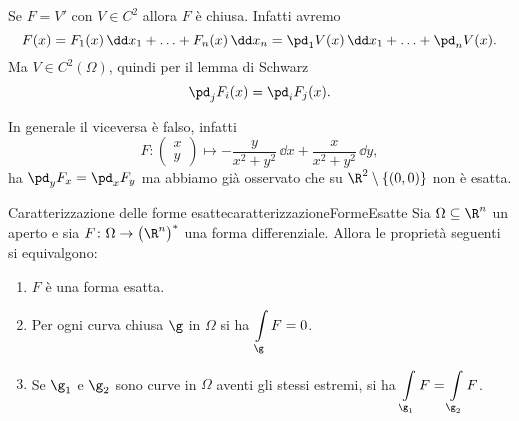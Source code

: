 \begin{oss}
	Se \(F=V'\) con \(V\in C^2\) allora \(F\) è chiusa.
	Infatti avremo
	\[
		F(x) = F_1(x)\,\dd x_1+ \ldots + F_n(x)\,\dd x_n = \pd_1 V(x)\,\dd x_1 + \ldots + \pd_n V(x).
	\]
	Ma \(V\in C^2(\Omega)\), quindi per il lemma di Schwarz
	\[
		\pd_j F_i(x) = \pd_i F_j(x).
	\]
\end{oss}

\begin{oss}
	In generale il viceversa è falso, infatti
	\[
		F\colon \begin{pmatrix}x\\y\end{pmatrix} \mapsto -\frac{y}{x^2+y^2}\,\dd x + \frac{x}{x^2+y^2}\,\dd y,
	\]
	ha \(\pd_y F_x= \pd_x F_y\) ma abbiamo già osservato che su \(\R^2\setminus\{(0,0)\}\) non è esatta.
\end{oss}

\begin{teor}{Caratterizzazione delle forme esatte}{caratterizzazioneFormeEsatte}
	Sia \(\Omega\subseteq \R^n\) un aperto e sia \(F\colon \Omega \to \big(\R^n\big)^*\) una forma differenziale.
	Allora le proprietà seguenti si equivalgono:
	\begin{enumerate}
		\item \(F\) è una forma esatta.
		\item Per ogni curva chiusa \(\g\) in \(\Omega\) si ha \(\displaystyle \int\limits_\g F=0\).
		\item Se \(\g_1\) e \(\g_2\) sono curve in \(\Omega\) aventi gli stessi estremi, si ha \(\displaystyle \int\limits_{\g_1} F = \int\limits_{\g_2} F\).
	\end{enumerate}
\end{teor}

